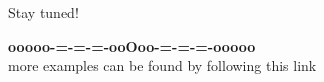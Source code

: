 \documentclass{ximera}
\begin{document}
Stay tuned!







\begin{onlineOnly}
\begin{center}
\textbf{\textcolor{green!50!black}{ooooo-=-=-=-ooOoo-=-=-=-ooooo}} \\

more examples can be found by following this link\\ 

\end{center}
\end{onlineOnly}
\end{document}
